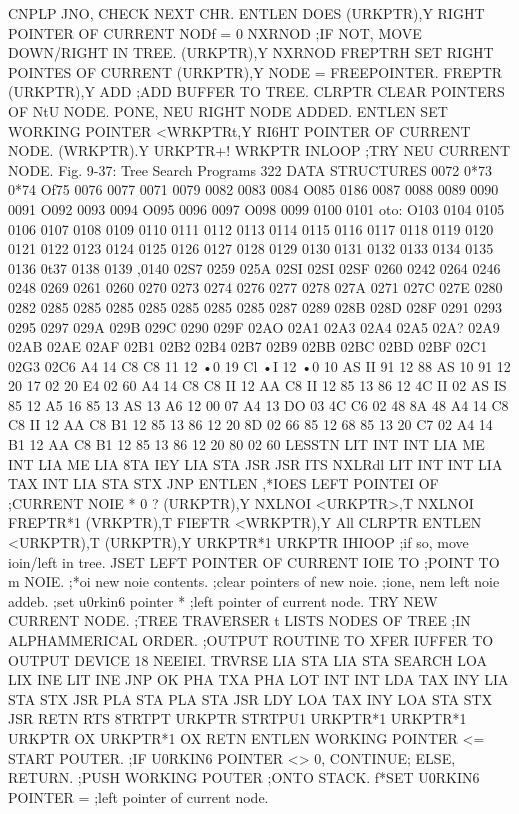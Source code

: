 {{{{{{{{{{{{{{{{{{{{{{{{{{{{{{{{{{{{{{{{{{{{{{{CNPLP JNO, CHECK NEXT CHR.
ENTLEN {DOES
(URKPTR),Y {RIGHT POINTER OF CURRENT NODf = 0
NXRNOD ;IF NOT, MOVE DOWN/RIGHT IN TREE.
(URKPTR),Y
NXRNOD
FREPTRH {SET RIGHT POINTES OF CURRENT
(URKPTR),Y {NODE = FREEPOINTER.
FREPTR
(URKPTR),Y
ADD ;ADD BUFFER TO TREE.
CLRPTR {CLEAR POINTERS OF NtU NODE.
{PONE, NEU RIGHT NODE ADDED.
ENTLEN {SET WORKING POINTER
<WRKPTRt,Y{ RI6HT POINTER OF CURRENT NODE.
(WRKPTR).Y
URKPTR+!
WRKPTR
INLOOP ;TRY NEU CURRENT NODE.
Fig. 9-37: Tree Search Programs
322
DATA STRUCTURES
0072
0*73
0*74
Of75
0076
0077
0071
0079
0082
0083
0084
O085
0186
0087
0088
0089
0090
0091
O092
0093
0094
O095
0096
0097
O098
0099
0100
0101
oto:
O103
0104
0105
0106
0107
0108
0109
0110
0111
0112
0113
0114
0115
0116
0117
0118
0119
0120
0121
0122
0123
0124
0125
0126
0127
0128
0129
0130
0131
0132
0133
0134
0135
0136
0t37
0138
0139
,0140
02S7
0259
025A
02SI
02SI
02SF
0260
0242
0264
0246
0248
0269
0261
0260
0270
0273
0274
0276
0277
0278
027A
0271
027C
027E
0280
0282
0285
0285
0285
0285
0285
0285
0285
0287
0289
028B
028D
028F
0291
0293
0295
0297
029A
029B
029C
0290
029F
02AO
02A1
02A3
02A4
02A5
02A?
02A9
02AB
02AE
02AF
02B1
02B2
02B4
02B7
02B9
02BB
02BC
02BD
02BF
02C1
02G3
02C6
A4 14
C8
C8
11 12
•0 19
Cl
•I 12
•0 10
AS II
91 12
88
AS 10
91 12
20 17 02
20 E4 02
60
A4 14
C8
C8
II 12
AA
C8
II 12
85 13
86 12
4C II 02
AS IS
85 12
A5 16
85 13
AS 13
A6 12
00 07
A4 13
DO 03
4C C6 02
48
8A
48
A4 14
C8
C8
II 12
AA
C8
B1 12
85 13
86 12
20 8D 02
66
85 12
68
85 13
20 C7 02
A4 14
B1 12
AA
C8
B1 12
85 13
86 12
20 80 02
60
LESSTN LIT
INT
INT
LIA
ME
INT
LIA
ME
LIA
8TA
IEY
LIA
STA
JSR
JSR
ITS
NXLRdl LIT
INT
INT
LIA
TAX
INT
LIA
STA
STX
JNP
ENTLEN ,*IOES LEFT POINTEI OF
;CURRENT NOIE * 0 ?
(URKPTR),Y
NXLNOI
<URKPTR>,T
NXLNOI
FREPTR*1
(VRKPTR),T
FIEFTR
<WRKPTR),Y
All
CLRPTR
ENTLEN
<URKPTR),T
(URKPTR),Y
URKPTR*1
URKPTR
IHIOOP
;if so, move ioin/left in tree.
JSET LEFT POINTER OF CURRENT IOIE TO
;POINT TO m NOIE.
;*oi new noie contents.
;clear pointers of new noie.
;ione, nem left noie addeb.
;set u0rkin6 pointer *
;left pointer of current node.
{TRY NEW CURRENT NODE.
;TREE TRAVERSER t LISTS NODES OF TREE
;IN ALPHAMMERICAL ORDER.
;OUTPUT ROUTINE TO XFER IUFFER TO OUTPUT
DEVICE 18 NEEIEI.
TRVRSE LIA
STA
LIA
STA
SEARCH LOA
LIX
INE
LIT
INE
JNP
OK PHA
TXA
PHA
LOT
INT
INT
LDA
TAX
INY
LIA
STA
STX
JSR
PLA
STA
PLA
STA
JSR
LDY
LOA
TAX
INY
LOA
STA
STX
JSR
RETN RTS
8TRTPT
URKPTR
STRTPU1
URKPTR*1
URKPTR*1
URKPTR
OX
URKPTR*1
OX
RETN
ENTLEN
{WORKING POINTER <= START POUTER.
;IF U0RKIN6 POINTER <> 0,
{CONTINUE;
{ELSE, RETURN.
;PUSH WORKING POUTER
;ONTO STACK.
f*SET U0RKIN6 POINTER =
;left pointer of current node.
}}}}}}}}}}}}}}}}}}}}}}}}}}}}}}}}}}}}}}}}}}}}}}}}}}}}}}}}}}}
